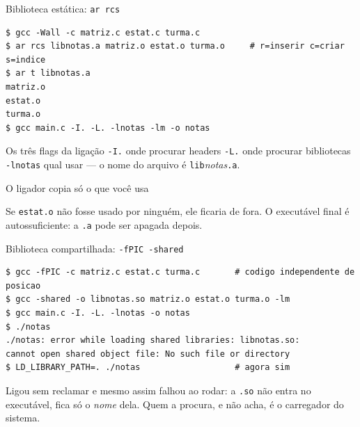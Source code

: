 \documentclass[aspectratio=169]{beamer}
\begin{document}
\begin{frame}[fragile]{Biblioteca estática: \texttt{ar rcs}}
\begin{lstlisting}[style=shellStyle]
$ gcc -Wall -c matriz.c estat.c turma.c
$ ar rcs libnotas.a matriz.o estat.o turma.o     # r=inserir c=criar s=indice
$ ar t libnotas.a
matriz.o
estat.o
turma.o
$ gcc main.c -I. -L. -lnotas -lm -o notas
\end{lstlisting}
  \begin{block}{Os três flags da ligação}
    \small \texttt{-I.} onde procurar headers \quad
    \texttt{-L.} onde procurar bibliotecas \quad
    \texttt{-lnotas} qual usar --- o nome do arquivo é
    \texttt{lib}\emph{notas}\texttt{.a}.
  \end{block}
\end{frame}

\begin{frame}{O ligador copia só o que você usa}
  \begin{center}
  \end{center}
  \begin{block}{}
    \small Se \texttt{estat.o} não fosse usado por ninguém, ele ficaria de
    fora. O executável final é autossuficiente: a \texttt{.a} pode ser
    apagada depois.
  \end{block}
\end{frame}

\begin{frame}[fragile]{Biblioteca compartilhada: \texttt{-fPIC -shared}}
\begin{lstlisting}[style=shellStyle]
$ gcc -fPIC -c matriz.c estat.c turma.c       # codigo independente de posicao
$ gcc -shared -o libnotas.so matriz.o estat.o turma.o -lm
$ gcc main.c -I. -L. -lnotas -o notas
$ ./notas
./notas: error while loading shared libraries: libnotas.so:
cannot open shared object file: No such file or directory
$ LD_LIBRARY_PATH=. ./notas                   # agora sim
\end{lstlisting}
  \begin{block}{}
    \small Ligou sem reclamar e mesmo assim falhou ao rodar: a
    \texttt{.so} não entra no executável, fica só o \emph{nome} dela. Quem a
    procura, e não acha, é o carregador do sistema.
  \end{block}
\end{frame}
\end{document}
